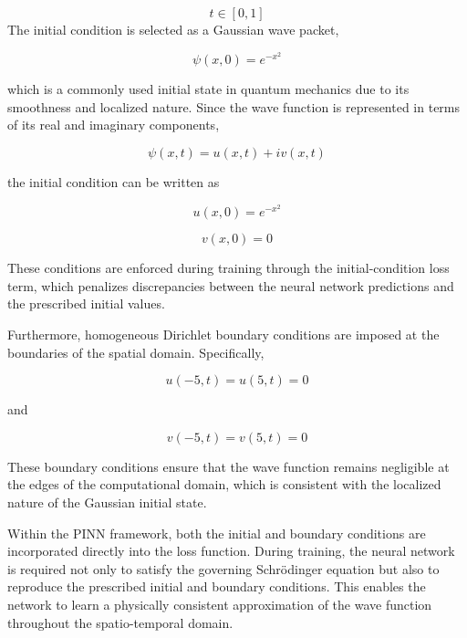 \documentclass[11pt]{article}
\begin{document}
\begin{equation}
    t \in [0,1]
\end{equation}
The initial condition is selected as a Gaussian wave packet,

\begin{equation}
    \psi(x,0)=e^{-x^2}
\end{equation}

which is a commonly used initial state in quantum mechanics 
due to its smoothness and localized nature. Since the wave 
function is represented in terms of its real and imaginary 
components,

\begin{equation}
    \psi(x,t)=u(x,t)+iv(x,t)
\end{equation}

the initial condition can be written as

\begin{equation}
    u(x,0)=e^{-x^2}
\end{equation}


\begin{equation}
    v(x,0)=0
\end{equation}

These conditions are enforced during training through the initial-condition 
loss term, which penalizes discrepancies between the 
neural network predictions and the prescribed initial values.

Furthermore, homogeneous Dirichlet boundary conditions are 
imposed at the boundaries of the spatial domain. 
Specifically,

\begin{equation}
    u(-5,t)=u(5,t)=0
\end{equation}

and

\begin{equation}
    v(-5,t)=v(5,t)=0
\end{equation}


These boundary conditions ensure that the wave function 
remains negligible at the edges of the computational domain, 
which is consistent with the localized nature of the 
Gaussian initial state.

Within the PINN framework, 
both the initial and boundary conditions are 
incorporated directly into the loss function. 
During training, the neural network is required not 
only to satisfy the governing Schrödinger equation but 
also to reproduce the prescribed initial and boundary 
conditions. This enables the network to learn a physically 
consistent approximation of the wave function throughout 
the spatio-temporal domain.
\end{document}
